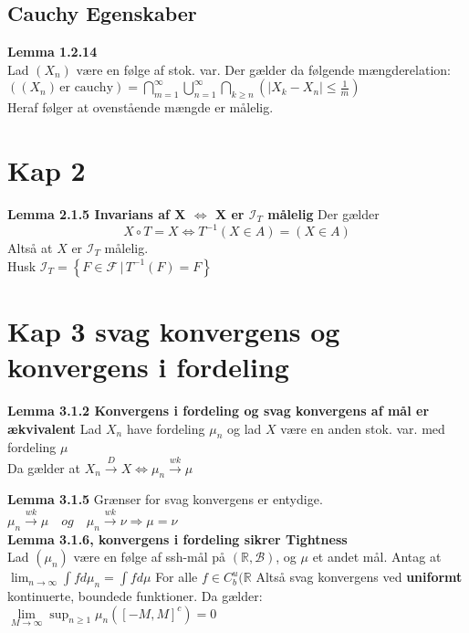 \subsection*{Cauchy Egenskaber}
\textbf{Lemma 1.2.14}\\
Lad $\left(X_n\right)$ være en følge af stok. var. Der gælder da følgende mængderelation:\\ 
$\left((X_n)\, \text{er cauchy}\right) = \bigcap_{m=1}^{\infty} \bigcup_{n=1}^\infty \bigcap_{k\geq n} \left(|X_k-X_n| \leq \frac{1}{m}\right)$\\
Heraf følger at ovenstående mængde er målelig.
\section*{Kap 2}
\textbf{Lemma 2.1.5 Invarians af X $\Longleftrightarrow$ X er $\mathcal{I}_T$ målelig}\newline
Der gælder $$X\circ T = X \Longleftrightarrow T^{-1}(X\in A) = (X\in A)$$
Altså at $X$ er $\mathcal{I}_T$ målelig.\\
Husk $\mathcal{I}_T=\left\{ F\in \mathcal{F}\,|\, T^{-1}(F)=F \right\rbrace$

\section*{Kap 3 svag konvergens og konvergens i fordeling}
\textbf{Lemma 3.1.2 Konvergens i fordeling og svag konvergens af mål er ækvivalent}\newline
Lad $X_n$ have fordeling $\mu_n$ og lad $X$ være en anden stok. var. med fordeling $\mu$\\
Da gælder at $X_n \xrightarrow{D} X \Longleftrightarrow \mu_n \xrightarrow{wk} \mu$  \newline

\textbf{Lemma 3.1.5}
Grænser for svag konvergens er entydige. $\mu_n \xrightarrow{wk} \mu \quad og \quad \mu_n \xrightarrow{wk} \nu \Longrightarrow \mu=\nu$ \\

\textbf{Lemma 3.1.6, konvergens i fordeling sikrer Tightness}\\
Lad $(\mu_n)$ være en følge af ssh-mål på $(\mathbb{R},\mathcal{B})$, og $\mu$ et andet mål.
Antag at $\lim_{n\to \infty} \int f d\mu_n = \int f d\mu $ For alle $f \in C_b^u(\mathbb{R}$ Altså svag konvergens ved \textbf{uniformt} kontinuerte, boundede funktioner. Da gælder:\\
$\lim\limits_{M\rightarrow\infty} \sup_{n\geq 1} \mu_n ([-M,M]^c)=0$\newline

